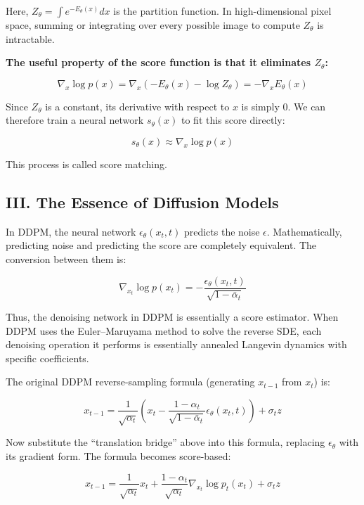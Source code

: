 Here, \(Z_\theta=\int e^{-E_\theta(x)}dx\) is the partition function. In high-dimensional pixel space, summing or integrating over every possible image to compute \(Z_\theta\) is intractable.

\textbf{The useful property of the score function is that it eliminates \(Z_\theta\):}

\[
\nabla_x\log p(x)=\nabla_x(-E_\theta(x)-\log Z_\theta)=-\nabla_x E_\theta(x)
\]

Since \(Z_\theta\) is a constant, its derivative with respect to \(x\) is simply 0. We can therefore train a neural network \(s_\theta(x)\) to fit this score directly:

\[
s_\theta(x)\approx\nabla_x\log p(x)
\]

This process is called score matching.

\hypertarget{iii.-the-essence-of-diffusion-models}{%
\subsection{III. The Essence of Diffusion Models}\label{iii.-the-essence-of-diffusion-models}}

In DDPM, the neural network \(\epsilon_\theta(x_t,t)\) predicts the noise \(\epsilon\). Mathematically, predicting noise and predicting the score are completely equivalent. The conversion between them is:

\[
\nabla_{x_t}\log p(x_t)=-\frac{\epsilon_\theta(x_t,t)}{\sqrt{1-\bar{\alpha}_t}}
\]

Thus, the denoising network in DDPM is essentially a score estimator. When DDPM uses the Euler--Maruyama method to solve the reverse SDE, each denoising operation it performs is essentially annealed Langevin dynamics with specific coefficients.

The original DDPM reverse-sampling formula (generating \(x_{t-1}\) from \(x_t\)) is:

\[
x_{t-1}=\frac{1}{\sqrt{\alpha_t}}
\left(x_t-\frac{1-\alpha_t}{\sqrt{1-\bar{\alpha}_t}}\epsilon_\theta(x_t,t)\right)
+\sigma_t z
\]

Now substitute the ``translation bridge'' above into this formula, replacing \(\epsilon_\theta\) with its gradient form. The formula becomes score-based:

\[
x_{t-1}=\frac{1}{\sqrt{\alpha_t}}x_t
+\frac{1-\alpha_t}{\sqrt{\alpha_t}}\nabla_{x_t}\log p_t(x_t)
+\sigma_t z
\]


